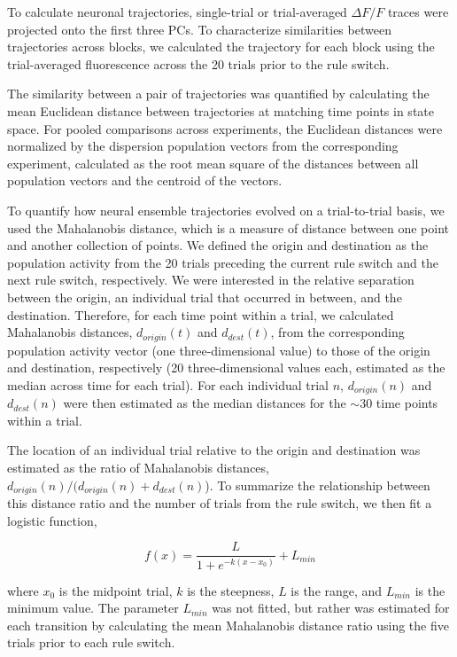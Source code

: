 To calculate neuronal trajectories, single-trial or trial-averaged $\Delta F/F$ traces were projected onto the first three PCs. To characterize similarities between trajectories across blocks, we calculated the trajectory for each block using the trial-averaged fluorescence across the 20 trials prior to the rule switch. 

The similarity between a pair of trajectories was quantified by calculating the mean Euclidean distance between trajectories at matching time points in state space. For pooled comparisons across experiments, the Euclidean distances were normalized by the dispersion population vectors from the corresponding experiment, calculated as the root mean square of the distances between all population vectors and the centroid of the vectors. 

To quantify how neural ensemble trajectories evolved on a trial-to-trial basis, we used the Mahalanobis distance, which is a measure of distance between one point and another collection of points. We defined the origin and destination as the population activity from the 20 trials preceding the current rule switch and the next rule switch, respectively. We were interested in the relative separation between the origin, an individual trial that occurred in between, and the destination. Therefore, for each time point within a trial, we calculated Mahalanobis distances, $d_{origin}(t)$ and $d_{dest}(t)$, from the corresponding population activity vector (one three-dimensional value) to those of the origin and destination, respectively (20 three-dimensional values each, estimated as the median across time for each trial). For each individual trial $n$, $d_{origin}(n)$ and $d_{dest}(n)$ were then estimated as the median distances for the $\sim 30$ time points within a trial. 

The location of an individual trial relative to the origin and destination was estimated as the ratio of Mahalanobis distances, $d_{origin}(n)/(d_{origin}(n) + d_{dest}(n)$). To summarize the relationship between this distance ratio and the number of trials from the rule switch, we then fit a logistic function,

\begin{equation*}
f(x) = \frac{L}{1+e^{-k(x-x_0)}} + L_{min}
\end{equation*}

\noindent where $x_0$ is the midpoint trial, $k$ is the steepness, $L$ is the range, and $L_{min}$ is the minimum value. The parameter $L_{min}$ was not fitted, but rather was estimated for each transition by calculating the mean Mahalanobis distance ratio using the five trials prior to each rule switch. 

